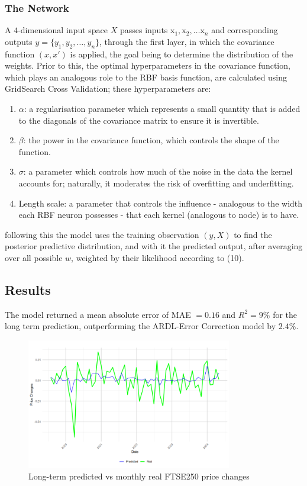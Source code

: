 \documentclass[12pt,a4paper]{article}
\begin{document}
\subsubsection{The Network}

A $4$-dimensional input space $X$
passes inputs $\boldsymbol{\mathrm{x}}_1, \boldsymbol{\mathrm{x}}_2,\ldots \boldsymbol{\mathrm{x}}_{n}$
and corresponding outputs \( y = \{y_1, y_2, \dots, y_n\} \), through the first
layer, in which the covariance function $(x,x')$
is applied, the goal being to determine the distribution of the weights. Prior to this,
the optimal hyperparameters in the covariance function, which plays an analogous
role to the RBF basis function, are calculated using GridSearch Cross Validation; these hyperparameters are:
\begin{enumerate}
    \item $\alpha$: a regularisation parameter which represents a small quantity
    that is added to the diagonals of the covariance matrix to ensure it is 
    invertible. 
    \item $\beta$: the power in the covariance function, which controls the shape of the function.
    \item $\sigma$: a parameter which controls how much of the noise in the data the kernel accounts for; naturally, 
    it moderates the risk of overfitting and underfitting.
    \item Length scale: a parameter that controls the influence - analogous to 
    the width each RBF neuron possesses - that each kernel (analogous to node) is to have.
\end{enumerate}
following this the model uses the training observation $(y,X)$ to find
the posterior predictive distribution, and with it the predicted output, after 
averaging over all possible $w$, weighted by their likelihood according to (10). 

\subsection{Results}

The model returned a mean absolute error of MAE $=0.16$ and 
$R^2 = 9\%$ for the long term prediction, outperforming the ARDL-Error Correction model by 
$2.4\%$.


\begin{figure}[h]
    \centering
    \includegraphics[width=0.8\textwidth]{long-term-monthly.png}
    \caption{Long-term predicted vs monthly real FTSE250 price changes}
    \label{fig:lmonthly}
\end{figure}
\end{document}
